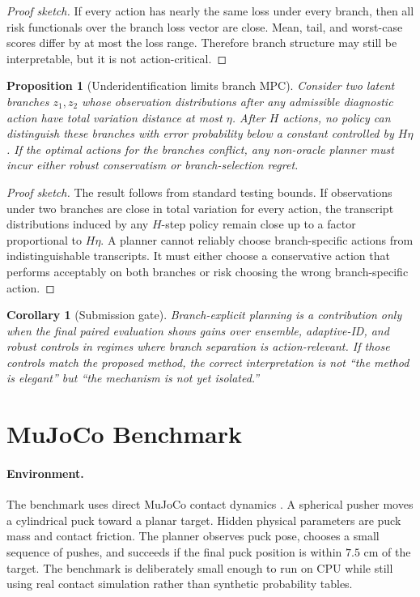 \documentclass{article}
\newtheorem{proposition}{Proposition}
\newtheorem{corollary}{Corollary}
\newcommand{\latent}{z}
\newcommand{\horizon}{H}
\begin{document}
\begin{proof}[Proof sketch]
If every action has nearly the same loss under every branch, then all risk functionals over the branch loss vector are close.  Mean, tail, and worst-case scores differ by at most the loss range.  Therefore branch structure may still be interpretable, but it is not action-critical.
\end{proof}

\begin{proposition}[Underidentification limits branch MPC]
Consider two latent branches $\latent_1,\latent_2$ whose observation distributions after any admissible diagnostic action have total variation distance at most $\eta$.  After $\horizon$ actions, no policy can distinguish these branches with error probability below a constant controlled by $\horizon\eta$.  If the optimal actions for the branches conflict, any non-oracle planner must incur either robust conservatism or branch-selection regret.
\end{proposition}

\begin{proof}[Proof sketch]
The result follows from standard testing bounds.  If observations under two branches are close in total variation for every action, the transcript distributions induced by any $\horizon$-step policy remain close up to a factor proportional to $\horizon\eta$.  A planner cannot reliably choose branch-specific actions from indistinguishable transcripts.  It must either choose a conservative action that performs acceptably on both branches or risk choosing the wrong branch-specific action.
\end{proof}

\begin{corollary}[Submission gate]
Branch-explicit planning is a contribution only when the final paired evaluation shows gains over ensemble, adaptive-ID, and robust controls in regimes where branch separation is action-relevant.  If those controls match the proposed method, the correct interpretation is not ``the method is elegant'' but ``the mechanism is not yet isolated.''
\end{corollary}

\section{MuJoCo Benchmark}

\paragraph{Environment.}
The benchmark uses direct MuJoCo contact dynamics \citep{todorov2012mujoco}.  A spherical pusher moves a cylindrical puck toward a planar target.  Hidden physical parameters are puck mass and contact friction.  The planner observes puck pose, chooses a small sequence of pushes, and succeeds if the final puck position is within $7.5$ cm of the target.  The benchmark is deliberately small enough to run on CPU while still using real contact simulation rather than synthetic probability tables.
\end{document}
